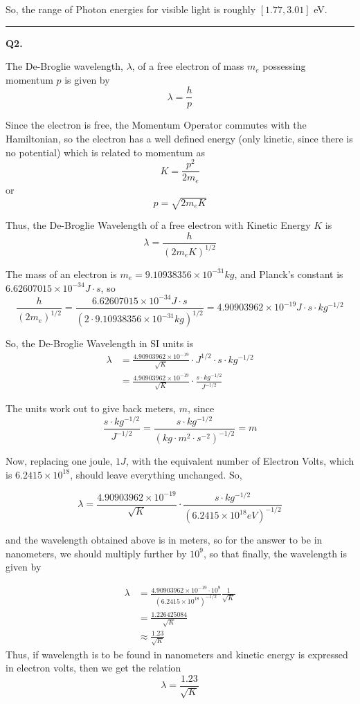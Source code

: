 \documentclass[twoside]{article}
\begin{document}
So, the range of Photon energies for visible light is roughly $[1.77, 3.01]$ eV.

\vskip 0.25cm
\hrule
\vskip 1cm

\textbf{Q2.} 

The De-Broglie wavelength, $\lambda$, of a free electron of mass $m_e$ possessing momentum $p$ is given by 
\[ \lambda = \frac{h}{p} \]

Since the electron is free, the Momentum Operator commutes with the Hamiltonian, so the electron has a well defined energy (only kinetic, since there is no potential) which is related to momentum as 
\[ K = \frac{p^2}{2m_e} \]
or 
\[ p = \sqrt{2m_eK} \]

Thus, the De-Broglie Wavelength of a free electron with Kinetic Energy $K$  is
\[ \lambda = \frac{h}{(2m_eK)^{1/2}} \]

The mass of an electron is $m_e = 9.10938356  \times 10^{-31} kg$, and Planck's constant is $6.62607015 \times 10^{-34} J \cdot s$, so
\[ \frac{h}{(2m_e)^{1/2}} = \frac{6.62607015 \times 10^{-34} J \cdot s}{(2 \cdot  9.10938356  \times 10^{-31} kg)^{1/2}} = 4.90903962\times10^{-19} J \cdot s \cdot kg^{-1/2} \]

So, the De-Broglie Wavelength in SI units is 
\begin{align*}
   \lambda &= \frac{4.90903962\times10^{-19}}{\sqrt{K}} \cdot J^{1/2} \cdot s \cdot kg^{-1/2} \\
   &= \frac{4.90903962\times10^{-19}}{\sqrt{K}} \cdot \frac{s \cdot kg^{-1/2}}{J^{-1/2}}
\end{align*}

The units work out to give back meters, $m$, since 
\[ \frac{s \cdot kg^{-1/2}}{J^{-1/2}} = \frac{s \cdot kg^{-1/2}}{(kg \cdot m^2\cdot s^{-2})^{-1/2}} = m\]

Now, replacing one joule, $1 J$, with the equivalent number of Electron Volts, which is $6.2415 \times 10^{18}$, should leave everything unchanged. So,

\[ \lambda = \frac{4.90903962\times10^{-19}}{\sqrt{K}} \cdot \frac{s \cdot kg^{-1/2}}{(6.2415 \times 10^{18} eV)^{-1/2}} \]

and the wavelength obtained above is in meters, so for the answer to be in nanometers, we should multiply further by $10^9$, so that finally, the wavelength is given by 

\begin{align*}
   \lambda &= \frac{4.90903962\times10^{-19} \cdot 10^9}{(6.2415 \times 10^{18})^{-1/2}} \frac{1}{\sqrt{K}} \\
   &= \frac{1.226425084}{\sqrt{K}} \\
   &\approx \frac{1.23}{\sqrt{K}} 
\end{align*} 
Thus, if wavelength is to be found in nanometers and kinetic energy is expressed in electron volts, then we get the relation
\[ \boxed{\lambda = \frac{1.23}{\sqrt{K}}}\]
\end{document}
